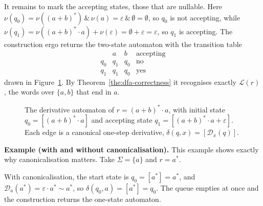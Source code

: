 It remains to mark the accepting states, those that are nullable. Here
$\nu(q_0)=\nu((a+b)^{*})\,\&\,\nu(a)=\varepsilon\,\&\,\emptyset=\emptyset$, so $q_0$
is not accepting, while
$\nu(q_1)=\nu((a+b)^{*}\cdot a)+\nu(\varepsilon)=\emptyset+\varepsilon=\varepsilon$,
so $q_1$ is accepting. The construction ergo returns the two-state automaton
with the transition table
\[
\begin{array}{c|cc|c}
        & a   & b   & \text{accepting}\\\hline
   q_0  & q_1 & q_0 & \text{no}\\
   q_1  & q_1 & q_0 & \text{yes}
\end{array}
\]
drawn in Figure~\ref{fig:deriv-dfa}. By Theorem~\ref{the:dfa-correctness} it
recognises exactly $\mathcal{L}(r)$, the words over $\{a,b\}$ that end in $a$.

\begin{figure}[h]
\centering
{}
\caption{The derivative automaton of $r=(a+b)^{*}\cdot a$, with initial state
$q_0=[(a+b)^{*}\cdot a]$ and accepting state $q_1=[(a+b)^{*}\cdot a+\varepsilon]$.
Each edge is a canonical one-step derivative, $\delta(q,x)=[\mathcal{D}_x(q)]$.}
\label{fig:deriv-dfa}
\end{figure}

\medskip
\noindent\textbf{Example (with and without canonicalisation).}
This example shows exactly why canonicalisation matters.
Take $\Sigma=\{a\}$ and $r=a^{*}$.

With canonicalisation, the start state is $q_0=[a^{*}]=a^{*}$, and
$\mathcal{D}_a(a^{*})=\varepsilon\cdot a^{*}\sim a^{*}$, so
$\delta(q_0,a)=[a^{*}]=q_0$. The queue empties at once and the construction returns
the one-state automaton.

\begin{center}
\end{center}

